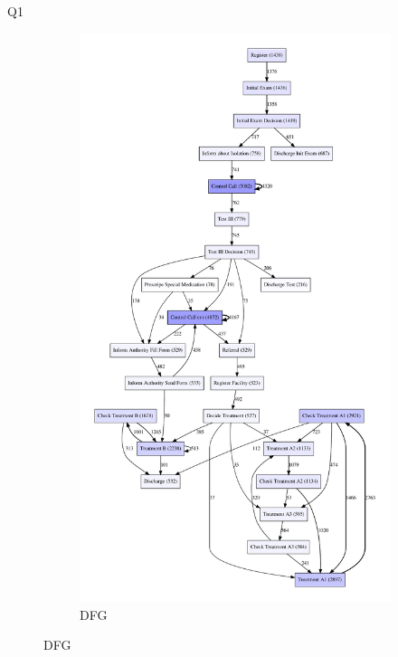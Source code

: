 \documentclass[12pt]{report}
\begin{document}
Q1

\begin{figure}[h]
    \centering
    \begin{subfigure}[b]{0.2\textwidth}
        \centering
	\includegraphics[width=\textwidth]{figures/q1_d_dfg_noise_threshold_tuning.pdf}
        \caption{DFG}
        \label{fig:figures-q1_d_dfg_noise_threshold_tuning-pdf}
    \end{subfigure}
    \hfill

\end{figure}
\end{document}
